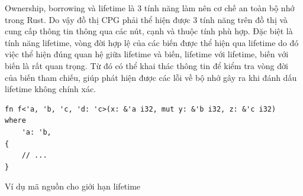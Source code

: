 Ownership, borrowing và lifetime là 3 tính năng làm nên cơ chế an toàn bộ nhớ trong Rust.
Do vậy đồ thị CPG phải thể hiện được 3 tính năng trên đồ thị và cung cấp thông tin thông qua các nút, cạnh và thuộc tính phù hợp.
Đặc biệt là tính năng lifetime, vòng đời hợp lệ của các biến được thể hiện qua lifetime do đó việc thể hiện đúng quan hệ giữa lifetime và biến, lifetime với lifetime, biến với biến là rất quan trọng.
Từ đó có thể khai thác thông tin để kiểm tra vòng đời của biến tham chiếu, giúp phát hiện được các lỗi về bộ nhớ gây ra khi đánh dấu lifetime không chính xác.




\begin{listing}[H]
\begin{verbatim}
fn f<'a, 'b, 'c, 'd: 'c>(x: &'a i32, mut y: &'b i32, z: &'c i32)
where
    'a: 'b,
{
    // ...
}
\end{verbatim}
\caption{Ví dụ mã nguồn cho giới hạn lifetime}
\label{code:c4_lifetime_2}
\end{listing}

